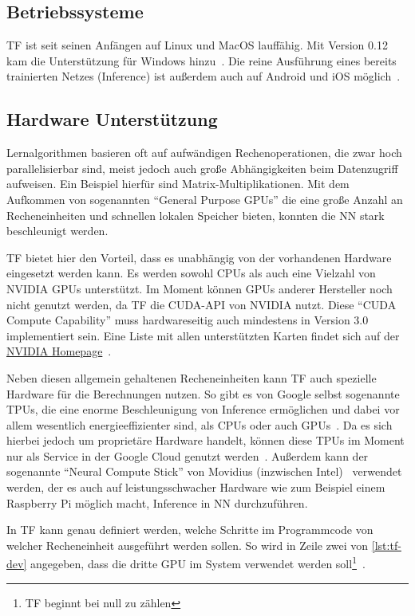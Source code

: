 \subsection{Betriebssysteme}
\gls{TF} ist seit seinen Anfängen auf Linux und MacOS lauffähig. Mit Version 0.12 kam die Unterstützung für Windows hinzu~\cite{tfRelease}. Die reine Ausführung eines bereits trainierten Netzes (Inference) ist außerdem auch auf Android und iOS möglich~\cite{tensorflow2015-whitepaper}\cite{tensorflow2016-whitepaper}.

\subsection{Hardware Unterstützung}
Lernalgorithmen basieren oft auf aufwändigen Rechenoperationen, die zwar hoch parallelisierbar sind, meist jedoch auch große Abhängigkeiten beim Datenzugriff aufweisen. Ein Beispiel hierfür sind Matrix-Multiplikationen. Mit dem Aufkommen von sogenannten "`General Purpose GPUs"' die eine große Anzahl an Recheneinheiten und schnellen lokalen Speicher bieten, konnten die \gls{NN} stark beschleunigt werden.

\gls{TF} bietet hier den Vorteil, dass es unabhängig von der vorhandenen Hardware eingesetzt werden kann. Es werden sowohl CPUs als auch eine Vielzahl von NVIDIA GPUs unterstützt. Im Moment können GPUs anderer Hersteller noch nicht genutzt werden, da \gls{TF} die CUDA-\gls{API} von NVIDIA nutzt. Diese "`CUDA Compute Capability"' muss hardwareseitig auch mindestens in Version 3.0 implementiert sein. Eine Liste mit allen unterstützten Karten findet sich auf der \href{https://developer.nvidia.com/cuda-gpus}{NVIDIA Homepage}~\cite{tfinstall}.

Neben diesen allgemein gehaltenen Recheneinheiten kann \gls{TF} auch spezielle Hardware für die Berechnungen nutzen. So gibt es von Google selbst sogenannte \glspl{TPU}, die eine enorme Beschleunigung von Inference ermöglichen und dabei vor allem wesentlich energieeffizienter sind, als CPUs oder auch GPUs~\cite{TPU}. Da es sich hierbei jedoch um proprietäre Hardware handelt, können diese \glspl{TPU} im Moment nur als Service in der Google Cloud genutzt werden~\cite{TPU2}. Außerdem kann der sogenannte "`Neural Compute Stick"' von Movidius (inzwischen Intel)~\cite{movidius} verwendet werden, der es auch auf leistungsschwacher Hardware wie zum Beispiel einem Raspberry Pi möglich macht, Inference in \gls{NN} durchzuführen.

In \gls{TF} kann genau definiert werden, welche Schritte im Programmcode von welcher Recheneinheit ausgeführt werden sollen. So wird in Zeile zwei von \autoref{lst:tf-dev} angegeben, dass die dritte GPU im System verwendet werden soll\footnote{\gls{TF} beginnt bei null zu zählen}~\cite{tf-dev}.

